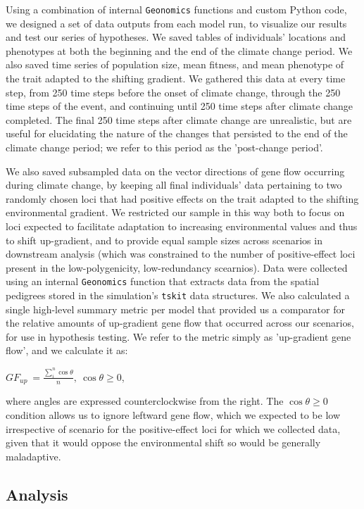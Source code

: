 \documentclass[9pt,twocolumn,twoside,lineno]{pnas-new}
\begin{document}
{Using a combination of internal \texttt{Geonomics} functions and custom Python code, we 
designed a set of data outputs from each model run, to visualize our
results and test our series of hypotheses.
We saved tables of individuals’ locations and phenotypes at both
the beginning and the end of the climate change period. We also saved time 
series of population size, mean fitness, and mean phenotype of the trait adapted to 
the shifting gradient. We gathered this data at every time step, from 250 time steps 
before the onset of climate change, through the 250 time steps of the event, and 
continuing until 250 time steps after climate change completed.
The final 250 time steps after climate change are unrealistic, but are useful
for elucidating the nature of the changes that persisted to the end of the climate change period;
we refer to this period as the 'post-change period'.

We also saved subsampled data on the vector directions
of gene flow occurring during climate change, by keeping all final individuals'
data pertaining to two randomly chosen loci that had positive
effects on the trait adapted to the shifting environmental gradient.
We restricted our sample in this way both to focus on loci expected to facilitate 
adaptation to increasing environmental values and thus to shift up-gradient, and to 
provide equal sample sizes across scenarios in downstream analysis (which was 
constrained to the number of positive-effect loci present in
the low-polygenicity, low-redundancy scearnios). 
Data were collected using an internal \texttt{Geonomics} function
that extracts data from the spatial pedigrees stored in the
simulation's \texttt{tskit} \cite{kelleher} data structures.
We also calculated a single high-level summary metric per model
that provided us a comparator for the relative amounts of
up-gradient gene flow that occurred across our scenarios,
for use in hypothesis testing.
We refer to the metric simply as 'up-gradient gene flow',
and we calculate it as:

$GF_{up}\ = \frac{\sum\limits_{i}^{n}\cos\theta}{n},\ \cos\theta\geq0$,

where angles are expressed counterclockwise from the right.
The $\cos\theta\geq0$ condition allows us to ignore leftward gene flow,
which we expected to be low irrespective of scenario for the positive-effect loci
for which we collected data,
given that it would oppose the environmental shift so would be generally maladaptive.


\subsection*{Analysis}

}
\end{document}
